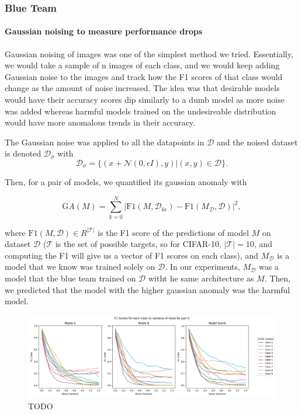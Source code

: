 \documentclass[letterpaper]{article} %
\begin{document}
\subsubsection*{Blue Team}
\paragraph{Gaussian noising to measure performance drops}
Gaussian noising of images was one of the simplest method we tried. Essentially, we would take a sample of n images of each class, and we would keep adding Gaussian noise to the images and track how the F1 scores of that class would change as the amount of noise increased. The idea was that desirable models would have their accuracy scores dip similarly to a dumb model as more noise was added whereas harmful models trained on the undesireable distribution would have more anomalous trends in their accuracy. 

The Gaussian noise was applied to all the datapoints in $\mathcal{D}$ and the noised dataset is denoted $\mathcal{D}_\sigma$ with
$$\mathcal{D}_\sigma = \{(x+\mathcal{N}(0,\epsilon I),y) | (x,y) \in \mathcal{D}\}.$$

Then, for a pair of models, we quantified its gaussian anomaly with

$$\text{G}A(M) = \sum_{k=0}^{N} |\text{F1}(M, \mathcal{D}_{k\epsilon}) - \text{F1}(M_\mathcal{D},\mathcal{D})|^2,$$

where $\text{F1}(M, \mathcal{D}) \in R^{|\mathcal{T}|}$ is the F1 score of the predictions of model $M$ on dataset $\mathcal{D}$ ($\mathcal{T}$ is the set of possible targets, so for CIFAR-10, $|\mathcal{T}|=10$, and computing the F1 will give us a vector of F1 scores on each class), and $M_\mathcal{D}$ is a model that we know was trained solely on $\mathcal{D}$. In our experiments, $M_\mathcal{D}$ was a model that the blue team trained on $\mathcal{D}$ witht he same architecture as $M$. Then, we predicted that the model with the higher gaussian anomaly was the harmful model.

\begin{figure}[h!]
\centering
\includegraphics[width=\columnwidth]{figures/round_1_gaussian_noise.png}
\caption{TODO}
\end{figure}
\end{document}
